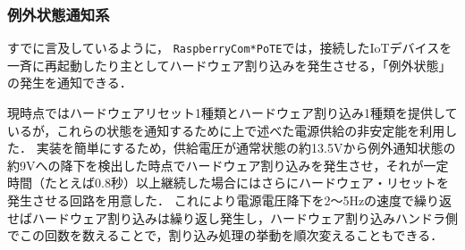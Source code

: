 {%


\subsubsection{例外状態通知系}


すでに言及しているように，
{\tt Raspberry\-Com*PoTE}では，接続したIoTデバイスを一斉に再起動したり主としてハードウェア割り込みを発生させる，「例外状態」の発生を通知できる．

現時点ではハードウェアリセット1種類とハードウェア割り込み1種類を提供しているが，これらの状態を通知するために上で述べた電源供給の非安定能を利用した．
実装を簡単にするため，供給電圧が通常状態の約13.5Vから例外通知状態の約9Vへの降下を検出した時点でハードウェア割り込みを発生させ，それが一定時間（たとえば0.8秒）以上継続した場合にはさらにハードウェア・リセットを発生させる回路を用意した．
これにより電源電圧降下を2〜5Hzの速度で繰り返せばハードウェア割り込みは繰り返し発生し，ハードウェア割り込みハンドラ側でこの回数を数えることで，割り込み処理の挙動を順次変えることもできる．



}
